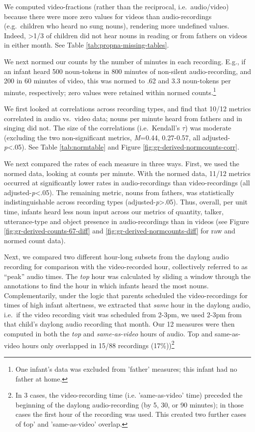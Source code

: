 \documentclass[man]{apa6}
\theoremstyle{definition}
\theoremstyle{definition}
\theoremstyle{definition}
\theoremstyle{remark}
\begin{document}
We computed video-fractions (rather than the reciprocal,
i.e.~audio/video) because there were more zero values for videos than
audio-recordings (e.g.~children who heard no sung nouns), rendering more
undefined values. Indeed, \textgreater{}1/3 of children did not hear
nouns in reading or from fathers on videos in either month. See Table
\ref{tab:propna-missing-tables}.

We next normed our counts by the number of minutes in each recording.
E.g., if an infant heard 500 noun-tokens in 800 minutes of non-silent
audio-recording, and 200 in 60 minutes of video, this was normed to .62
and 3.3 noun-tokens per minute, respectively; zero values were retained
within normed
counts.\footnote{One infant's data was excluded from 'father' measures; this infant had no father at home.}

We first looked at correlations across recording types, and find that
10/12 metrics correlated in audio vs.~video data; nouns per minute heard
from fathers and in singing did not. The size of the correlations
(i.e.~Kendall's \(\tau\)) was moderate (excluding the two
non-significant metrics, \emph{M}=0.44, 0.27-0.57, all
adjusted-\emph{p}\textless{}.05). See Table \ref{tab:normtable} and
Figure \ref{fig:gr-derived-normcounts-corr}.

We next compared the rates of each measure in three ways. First, we used
the normed data, looking at counts per minute. With the normed data,
11/12 metrics occurred at significantly lower rates in audio-recordings
than video-recordings (all adjusted-\emph{p}\textless{}.05). The
remaining metric, nouns from fathers, was statistically
indistinguishable across recording types
(adjusted-\emph{p}\textgreater{}.05). Thus, overall, per unit time,
infants heard less noun input across our metrics of quantity, talker,
utterance-type and object presence in audio-recordings than in videos
(see Figure \ref{fig:gr-derived-counts-67-diff} and
\ref{fig:gr-derived-normcounts-diff} for raw and normed count data).

Next, we compared two different hour-long subsets from the daylong audio
recording for comparison with the video-recorded hour, collectively
referred to as \enquote{peak} audio times. The \emph{top} hour was
calculated by sliding a window through the annotations to find the hour
in which infants heard the most nouns. Complementarily, under the logic
that parents scheduled the video-recordings for times of high infant
altertness, we extracted that \emph{same} hour in the daylong audio,
i.e.~if the video recording visit was scheduled from 2-3pm, we used
2-3pm from that child's daylong audio recording that month. Our 12
measures were then computed in both the \emph{top} and
\emph{same-as-video} hours of audio. Top and same-as-video hours only
overlapped in 15/88 recordings
(17\%))\footnote{In 3 cases, the video-recording time (i.e. 'same-as-video' time) preceded the beginning of the daylong audio-recording (by 5, 30, or 90 minutes); in those cases the first hour of the recording was used. This created two further cases of \'top' and 'same-as-video' overlap.}
\end{document}
